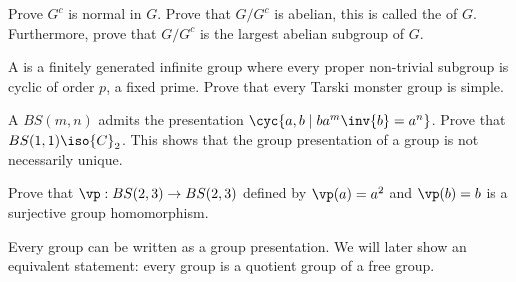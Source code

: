 \documentclass[10pt]{article}
\begin{document}
\begin{problem}
    Prove ${G}^{c}$ is normal in $G$. Prove that $G/{G}^{c}$ is abelian, this is called the  of $G$. Furthermore, prove that $G/{G}^{c}$ is the largest abelian subgroup of $G$.
\end{problem}
\begin{problem}
    A  is a finitely generated infinite group where every proper non-trivial subgroup is cyclic of order $p$, a fixed prime. Prove that every Tarski monster group is simple.
\end{problem}
\begin{problem}
    A  $BS(m,n)$ admits the presentation $\cyc{a,b\mid b{a}^{m}\inv{b}={a}^{n}}$. Prove that $BS(1,1)\iso{C}_{2}$. This shows that the group presentation of a group is not necessarily unique.
\end{problem}
\begin{problem}
    Prove that $\vp:BS(2,3)\to BS(2,3)$ defined by $\vp(a)={a}^{2}$ and $\vp(b)=b$ is a surjective group homomorphism.
\end{problem}
\par
Every group can be written as a group presentation. We will later show an equivalent statement: every group is a quotient group of a free group.


\newpage
\end{document}

